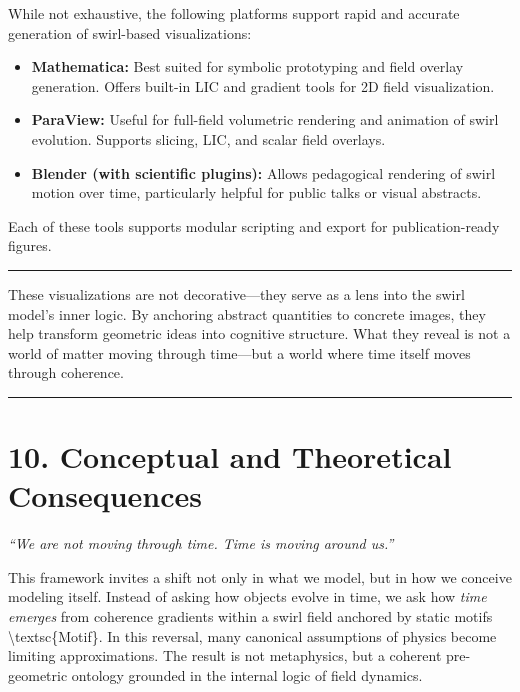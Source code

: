 \documentclass[
  11pt,
]{article}
\begin{document}
While not exhaustive, the following platforms support rapid and accurate
generation of swirl-based visualizations:

\begin{itemize}
\item
  \textbf{Mathematica:} Best suited for symbolic prototyping and field
  overlay generation. Offers built-in LIC and gradient tools for 2D
  field visualization.
\item
  \textbf{ParaView:} Useful for full-field volumetric rendering and
  animation of swirl evolution. Supports slicing, LIC, and scalar field
  overlays.
\item
  \textbf{Blender (with scientific plugins):} Allows pedagogical
  rendering of swirl motion over time, particularly helpful for public
  talks or visual abstracts.
\end{itemize}

Each of these tools supports modular scripting and export for
publication-ready figures.

\begin{center}\rule{0.5\linewidth}{0.5pt}\end{center}

These visualizations are not decorative---they serve as a lens into the
swirl model's inner logic. By anchoring abstract quantities to concrete
images, they help transform geometric ideas into cognitive structure.
What they reveal is not a world of matter moving through time---but a
world where time itself moves through coherence.

\begin{center}\rule{0.5\linewidth}{0.5pt}\end{center}

\section{10. Conceptual and Theoretical
Consequences}\label{conceptual-and-theoretical-consequences}

\emph{``We are not moving through time. Time is moving around us.''}

This framework invites a shift not only in what we model, but in how we
conceive modeling itself. Instead of asking how objects evolve in time,
we ask how \emph{time emerges} from coherence gradients within a swirl
field anchored by static motifs \textbackslash textsc\{Motif\}. In this
reversal, many canonical assumptions of physics become limiting
approximations. The result is not metaphysics, but a coherent
pre-geometric ontology grounded in the internal logic of field dynamics.
\end{document}
